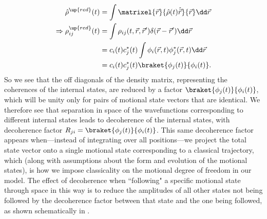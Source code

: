 \begin{align}
\hat\rho^\up{red}(t) &= \int\matrixel{\vec r}{\hat \rho(t) \hat {\vec r}}{\vec r}\dd \vec r\\
\Rightarrow \rho^\up{red}_{ij}(t) &= \int\rho_{ij}(t, \vec r, \vec r^\prime)\delta(\vec r - \vec r^\prime)\dd \vec r\\
&= c_i(t) c_j^*(t)\int\phi_i(\vec r, t)\phi_j^*(\vec r, t)\dd \vec r\\
&= c_i(t) c_j^*(t)\braket{\phi_j(t)}{\phi_i(t)}.
\end{align}
So we see that the off diagonals of the density matrix, representing the coherences of the internal states, are reduced by a factor $\braket{\phi_j(t)}{\phi_i(t)}$, which will be unity only for pairs of motional state vectors that are identical. We therefore see that separation in space of the wavefunctions corresponding to different internal states leads to decoherence of the internal states, with decoherence factor $R_{ji} = \braket{\phi_j(t)}{\phi_i(t)}$. This same decoherence factor appears when---instead of integrating over all positions---we project the total state vector onto a single motional state corresponding to a classical trajectory, which (along with assumptions about the form and evolution of the motional states), is how we impose classicality on the motional degree of freedom in our model. The effect of decoherence when ``following" a specific motional state through space in this way is to reduce the amplitudes of all other states not being followed by the decoherence factor between that state and the one being followed, as shown schematically in .

